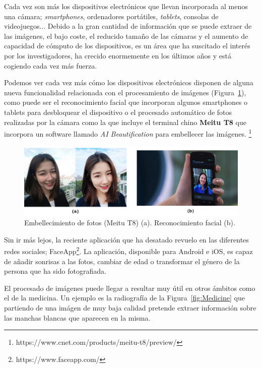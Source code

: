 Cada vez son más los dispositivos electrónicos que llevan incorporada al menos una cámara; \textit{smartphones}, ordenadores portátiles, \textit{tablets}, consolas de videojuegos... Debido a la gran cantidad de información que se puede extraer de las imágenes, el bajo coste, el reducido tamaño de las cámaras y el aumento de capacidad de cómputo de los dispositivos, es un área que ha suscitado el interés por los investigadores, ha crecido enormemente en los últimos años y está cogiendo cada vez más fuerza.

Podemos ver cada vez más cómo los dispositivos electrónicos disponen de alguna nueva funcionalidad relacionada con el procesamiento de imágenes (Figura~\ref{fig:Face}), como puede ser el reconocimiento facial que incorporan algunos smartphones o tablets para desbloquear el dispositivo o el procesado automático de fotos realizadas por la cámara como la que incluye el terminal chino \textbf{Meitu T8} que incorpora un software llamado \textit{AI Beautification} para embellecer las imágenes. \footnote{https://www.cnet.com/products/meitu-t8/preview/}

\begin{figure}[th]
\centering
\includegraphics[scale=0.43]{Figures/face.png}
\decoRule
\caption[Embellecimiento de fotos (Meitu T8)]{Embellecimiento de fotos (Meitu T8) (a). Reconocimiento facial (b).}
\label{fig:Face}
\end{figure}

Sin ir más lejos, la reciente aplicación que ha desatado revuelo en las diferentes redes sociales; FaceApp\footnote{https://www.faceapp.com/}. La aplicación, disponible para Android e iOS, es capaz de añadir sonrisas a las fotos, cambiar de edad o transformar el género de la persona que ha sido fotografiada.

El procesado de imágenes puede llegar a resultar muy útil en otros ámbitos como el de la medicina. Un ejemplo es la radiografía de la Figura~\ref{fig:Medicine} que partiendo de una imágen de muy baja calidad pretende  extraer  información  sobre  las  manchas
blancas que aparecen en la misma.


